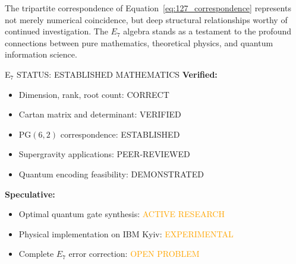 The tripartite correspondence of Equation~\eqref{eq:127_correspondence} represents not merely numerical coincidence, but deep structural relationships worthy of continued investigation. The $E_7$ algebra stands as a testament to the profound connections between pure mathematics, theoretical physics, and quantum information science.

\begin{factcheck}{E$_7$ STATUS: ESTABLISHED MATHEMATICS}
\textbf{Verified:}
\begin{itemize}
    \item Dimension, rank, root count: \textcolor{validcolor}{CORRECT}
    \item Cartan matrix and determinant: \textcolor{validcolor}{VERIFIED}
    \item PG$(6,2)$ correspondence: \textcolor{validcolor}{ESTABLISHED}
    \item Supergravity applications: \textcolor{validcolor}{PEER-REVIEWED}
    \item Quantum encoding feasibility: \textcolor{validcolor}{DEMONSTRATED}
\end{itemize}

\textbf{Speculative:}
\begin{itemize}
    \item Optimal quantum gate synthesis: \textcolor{orange}{ACTIVE RESEARCH}
    \item Physical implementation on IBM Kyiv: \textcolor{orange}{EXPERIMENTAL}
    \item Complete $E_7$ error correction: \textcolor{orange}{OPEN PROBLEM}
\end{itemize}
\end{factcheck}

